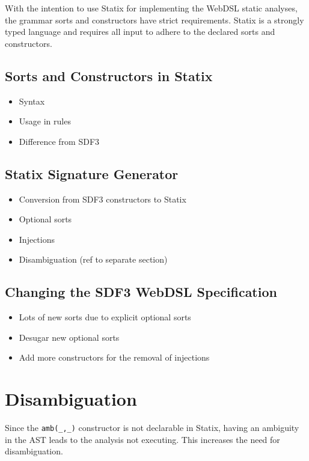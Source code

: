     With the intention to use Statix for implementing the WebDSL static analyses, the grammar sorts and constructors have strict requirements. Statix is a strongly typed language and requires all input to adhere to the declared sorts and constructors.

    \subsection{Sorts and Constructors in Statix}

      \begin{itemize}
        \item Syntax
        \item Usage in rules
        \item Difference from SDF3
      \end{itemize}

    \subsection{Statix Signature Generator}

      \begin{itemize}
        \item Conversion from SDF3 constructors to Statix
        \item Optional sorts
        \item Injections
        \item Disambiguation (ref to separate section)
      \end{itemize}

    \subsection{Changing the SDF3 WebDSL Specification}

      \begin{itemize}
        \item Lots of new sorts due to explicit optional sorts
        \item Desugar new optional sorts
        \item Add more constructors for the removal of injections
      \end{itemize}

  \section{Disambiguation}
  
    Since the \texttt{amb(\_,\_)} constructor is not declarable in Statix, having an ambiguity in the AST leads to the analysis not executing. This increases the need for disambiguation.

